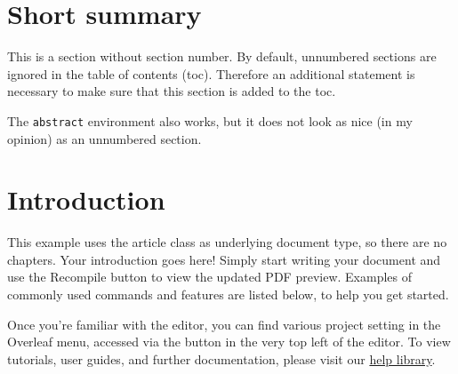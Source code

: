 \documentclass[12pt,a4paper,faculty=eb,language=en,doctype=article]{ugent-doc}
\renewcommand{\ULthickness}{2pt} %
\begin{document}

\maketitle
\renewcommand{\ULthickness}{1pt}


{\hypersetup{hidelinks}\tableofcontents} %
\newpage


\section*{Short summary}

This is a section without section number.
By default, unnumbered sections are ignored in the table of contents (toc).
Therefore an additional statement is necessary to make sure that this section is added to the toc.

The \verb|abstract| environment also works, but it does not look as nice (in my opinion) as an unnumbered section.


\section{Introduction}

This example uses the article class as underlying document type, so there are no chapters.
Your introduction goes here! Simply start writing your document and use the Recompile button to view the updated PDF preview.
Examples of commonly used commands and features are listed below, to help you get started.

Once you're familiar with the editor, you can find various project setting in the Overleaf menu, accessed via the button in the very top left of the editor.
To view tutorials, user guides, and further documentation, please visit our \href{https://www.overleaf.com/learn}{help library}.
\end{document}
